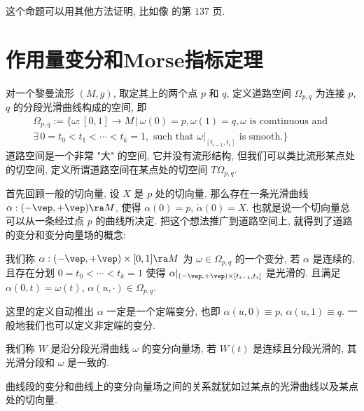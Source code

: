         \begin{remark}
            这个命题可以用其他方法证明, 比如像 {\rm \cite{梅加强2013流形与几何初步}} 的第 $137$ 页.
        \end{remark}

\section{作用量变分和Morse指标定理}
对一个黎曼流形 $(M,g)$, 取定其上的两个点 $p$ 和 $q$, 定义道路空间 $\Omega_{p,q}$ 为连接 $p$, $q$ 的分段光滑曲线构成的空间, 即
\begin{align*}
    \Omega_{p,q}:=\Big\{\omega:[0,1]\rightarrow M\,\Big|\,\omega(0)=p,\omega(1)=q, 
    \omega \text{ is comtinuous and } \\
    \exists\, 0=t_0<t_1<\cdots<t_k=1, 
    \text{ such that }\omega|_{[t_{i-1},t_i]}\text{ is smooth.}\Big\}
\end{align*}
道路空间是一个非常 "大" 的空间, 它并没有流形结构, 
但我们可以类比流形某点处的切空间, 定义所谓道路空间在某点处的切空间 $T\Omega_{p,q}$.

首先回顾一般的切向量, 设 $X$ 是 $p$ 处的切向量, 
那么存在一条光滑曲线 $\alpha:(-\vep,+\vep)\ra M$, 
使得 $\alpha(0)=p$, $\dot{\alpha}(0)=X$.
也就是说一个切向量总可以从一条经过点 $p$ 的曲线所决定. 
把这个想法推广到道路空间上, 
就得到了道路的变分和变分向量场的概念:
\begin{definition}
    我们称 $\alpha:(-\vep,+\vep)\times[0,1]\ra M$ 为 $\omega\in\Omega_{p,q}$ 的一个变分, 
    若 $\alpha$ 是连续的, 且存在分划 $0=t_0<\cdots<t_k=1$ 
    使得 $\alpha|_{(-\vep,+\vep)\times[t_{i-1},t_i]}$ 是光滑的. 
    且满足 $\alpha(0,t)=\omega(t)$, $\alpha(u,\cdot)\in\Omega_{p,q}$.
\end{definition}
\begin{remark}
    这里的定义自动推出 $\alpha$ 一定是一个定端变分, 
    也即 $\alpha(u,0)\equiv p,\,\alpha(u,1)\equiv q$. 
    一般地我们也可以定义非定端的变分.
\end{remark}
\begin{definition}
    我们称 $W$ 是沿分段光滑曲线 $\omega$ 的变分向量场, 
    若 $W(t)$ 是连续且分段光滑的, 其光滑分段和 $\omega$ 是一致的.
\end{definition}
\begin{remark}
    曲线段的变分和曲线上的变分向量场之间的关系就犹如过某点的光滑曲线以及某点处的切向量.  
\end{remark}